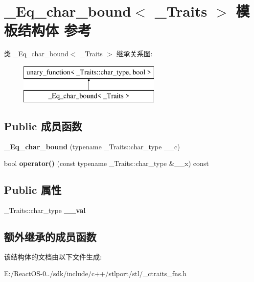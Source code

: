 \hypertarget{struct___eq__char__bound}{}\section{\+\_\+\+Eq\+\_\+char\+\_\+bound$<$ \+\_\+\+Traits $>$ 模板结构体 参考}
\label{struct___eq__char__bound}
类 \+\_\+\+Eq\+\_\+char\+\_\+bound$<$ \+\_\+\+Traits $>$ 继承关系图\+:\begin{figure}[H]
\begin{center}
\leavevmode
\includegraphics[height=2.000000cm]{struct___eq__char__bound}
\end{center}
\end{figure}
\subsection*{Public 成员函数}
\begin{DoxyCompactItemize}
\item 
\mbox{\label{struct___eq__char__bound_aa4cb699c18f07f7c8df34672ffc40d3f}} 
{\bfseries \+\_\+\+Eq\+\_\+char\+\_\+bound} (typename \+\_\+\+Traits\+::char\+\_\+type \+\_\+\+\_\+c)
\item 
\mbox{\label{struct___eq__char__bound_aedaed7622d1b9da85fa69188671bf7c9}} 
bool {\bfseries operator()} (const typename \+\_\+\+Traits\+::char\+\_\+type \&\+\_\+\+\_\+x) const
\end{DoxyCompactItemize}
\subsection*{Public 属性}
\begin{DoxyCompactItemize}
\item 
\mbox{\label{struct___eq__char__bound_a6d099e9d7c70ed8f680087e323b04fd0}} 
\+\_\+\+Traits\+::char\+\_\+type {\bfseries \+\_\+\+\_\+val}
\end{DoxyCompactItemize}
\subsection*{额外继承的成员函数}


该结构体的文档由以下文件生成\+:\begin{DoxyCompactItemize}
\item 
E\+:/\+React\+O\+S-\/0../sdk/include/c++/stlport/stl/\+\_\+ctraits\+\_\+fns.\+h\end{DoxyCompactItemize}
